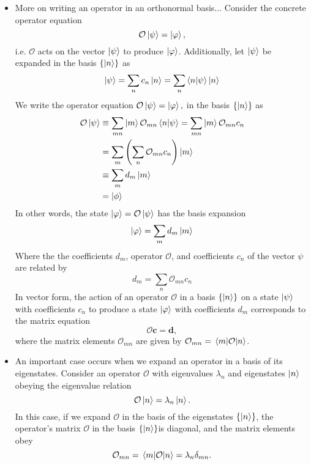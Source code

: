 \documentclass[11pt, a4paper]{article}
\renewcommand{\vec}[1]{\bm{#1}} %
\renewcommand{\O}{\mathcal{O}}  %
\newcommand{\p}{\psi}  %
\begin{document}
\begin{itemize}
	\item More on writing an operator in an orthonormal basis... Consider the concrete operator equation
	\begin{equation*}
		\O \ket{\psi} = \ket{\varphi},
	\end{equation*}
	i.e. $ \O $ acts on the vector $ \ket{\psi} $ to produce $ \ket{\varphi} $. Additionally, let $ \ket{\psi} $ be expanded in the basis $ \{\ket{n} \} $ as
	\begin{equation*}
		\ket{\psi} = \sum_{n}c_{n} \ket{n} = \sum_{n} \braket{n}{\psi} \ket{n} 
	\end{equation*}
	 We write the operator equation $ \O \ket{\psi} = \ket{\varphi}, $ in the basis $ \{\ket{n}\} $ as
	\begin{align*}
		\O \ket{\p} &\equiv \sum_{mn}\ket{m}\O_{mn}\bra{n}  \ket{\psi} = \sum_{mn}\ket{m} \O_{mn}  c_{n}\\
		& = \sum_{m}\left(\sum_{n}\O_{mn}c_{n}\right) \ket{m} \\
		& \equiv \sum_{m}d_{m}\ket{m} \\
		& = \ket{\phi}
	\end{align*}
	In other words, the state $ \ket{\varphi} = \O \ket{\p} $ has the basis expansion
	\begin{equation*}
		\ket{\varphi} = \sum_{m} d_{m}\ket{m}
	\end{equation*}
	Where the the coefficients $ d_{m} $, operator $ \O $, and coefficients $ c_{n} $ of the vector $ \psi $ are related by 
	\begin{equation*}
		d_{m} = \sum_{n}\O_{mn} c_{n}
	\end{equation*}
	In vector form, the action of an operator $ \O $ in a basis $ \{\ket{n}\} $ on a state $ \ket{\p} $ with coefficients $ c_{n} $ to produce a state $ \ket{\varphi} $ with coefficients $ d_{m} $ corresponds to the matrix equation
	\begin{equation*}
		\bm{\O} \vec{c} = \vec{d},
	\end{equation*}
	where the matrix elements $ \O_{mn} $ are given by $ \O_{mn} = \mel{m}{\O}{n} $.
	
	\item An important case occurs when we expand an operator in a basis of its eigenstates. Consider an operator $ \O $ with eigenvalues $ \lambda_{n} $ and eigenstates $ \ket{n} $ obeying the eigenvalue relation
	\begin{equation*}
		\O \ket{n} = \lambda_{n} \ket{n}.
	\end{equation*}
	In this case, if we expand $ \O $ in the basis of the eigenstates $ \{\ket{n}\} $, the operator's matrix $ \bm{\O} $ in the basis $ \{\ket{n}\} $is diagonal, and the matrix elements obey
	\begin{equation*}
		\O_{mn} = \mel{m}{\O}{n} = \lambda_{n} \delta_{mn}.
	\end{equation*}
	
\end{itemize}
\end{document}

